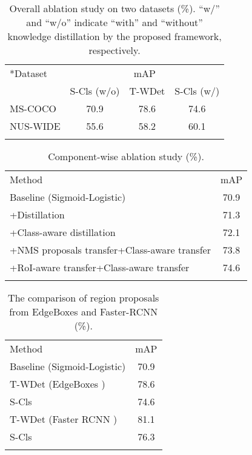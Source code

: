 \documentclass[sigconf,natbib=false]{acmart}
\begin{document}
\begin{table}[t]
  \centering
\small
  \caption{\small Overall ablation study on two datasets (\%). ``w/'' and ``w/o'' indicate ``with'' and ``without'' knowledge distillation by the proposed framework, respectively.}
  \vspace{-7pt}
  \label{tab:ablation_overall}
  \begin{tabular}{l|ccc}
  \Xhline{1.2pt}
  \multirow{2}*{Dataset}&\multicolumn{3}{c}{mAP} \\
  \cline{2-4}
  &S-Cls (w/o)&T-WDet&S-Cls (w/) \\
  \Xhline{1.2pt}
  MS-COCO&70.9&78.6&74.6 \\
  NUS-WIDE&55.6&58.2&60.1 \\
  \Xhline{1.2pt}
  \end{tabular}
  \vspace{-5pt}
\end{table}
\begin{table}[t]
  \centering
\small
  \caption{\small Component-wise ablation study (\%).}
  \vspace{-7pt}
  \label{tab:ablation_component}
  \begin{tabular}{l|c}
  \Xhline{1.2pt}
  Method&mAP \\
  \Xhline{1.2pt}
  Baseline (Sigmoid-Logistic)&70.9 \\
 \hline
  +Distillation \cite{KD1_nips15_goj}&71.3 \\
  +Class-aware distillation&72.1 \\
+NMS proposals transfer+Class-aware transfer&73.8 \\
  +RoI-aware transfer+Class-aware transfer&74.6 \\
  \Xhline{1.2pt}
  \end{tabular}
  \vspace{-8pt}
\end{table}

\begin{table}[t]
  \centering
\small
  \caption{\small The comparison of region proposals from EdgeBoxes \cite{WSD3_eccv14_cp} and Faster-RCNN \cite{Faster-RCNN_nips15_skfj} (\%).}
  \vspace{-5pt}
  \label{tab:fasterRcnn}
  \begin{tabular}{l|c}
  \Xhline{1.2pt}
  Method&mAP \\
  \Xhline{1.2pt}
  Baseline (Sigmoid-Logistic)&70.9 \\
  \hline
  T-WDet (EdgeBoxes \cite{WSD3_eccv14_cp})&78.6 \\
  S-Cls&74.6 \\
  \hline
  T-WDet (Faster RCNN \cite{Faster-RCNN_nips15_skfj})&81.1 \\
  S-Cls&76.3 \\
  \Xhline{1.2pt}
  \end{tabular}
  \vspace{-8pt}
\end{table}
\end{document}
